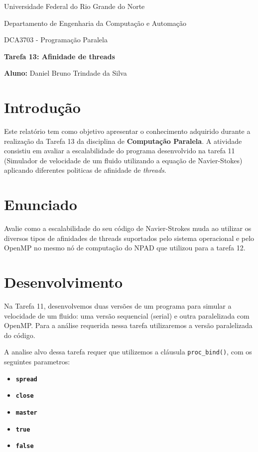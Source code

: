 \documentclass[a4paper, 12pt]{article}
\begin{document}
	\begin{center}
		Universidade Federal do Rio Grande do Norte
		
		Departamento de Engenharia da Computação e Automação  
		
		DCA3703 - Programação Paralela  
		
		\textbf{Tarefa 13: Afinidade de threads}  
		
		\textbf{Aluno:} Daniel Bruno Trindade da Silva  
	\end{center}  
	
	\section{Introdução}  
	\hspace{.62cm}Este relatório tem como objetivo apresentar o conhecimento adquirido durante a realização da Tarefa 13 da disciplina de \textbf{Computação Paralela}. A atividade consistiu em avaliar a escalabilidade do programa desenvolvido na tarefa 11 (Simulador de velocidade de um fluido utilizando a equação de Navier-Stokes) aplicando diferentes politicas de afinidade de \textit{threads}.
	
	\section{Enunciado}    
	\hspace{.62cm} Avalie como a escalabilidade do seu código de Navier-Strokes muda ao utilizar os diversos tipos de afinidades de threads suportados pelo sistema operacional e pelo OpenMP no mesmo nó de computação do NPAD que utilizou para a tarefa 12.
	
	\section{Desenvolvimento}
	\hspace{.62cm}Na Tarefa 11, desenvolvemos duas versões de um programa para simular a velocidade de um fluido: uma versão sequencial (serial) e outra paralelizada com OpenMP. Para a análise requerida nessa tarefa utilizaremos a versão paralelizada do código.
	
	A analise alvo dessa tarefa requer que utilizemos a cláusula \texttt{proc\_bind()}, com os seguintes parametros:
	
	\begin{itemize}
		\item \textbf{\texttt{spread}}
		\item \textbf{\texttt{close}}
		\item \textbf{\texttt{master}}
		\item \textbf{\texttt{true}}
		\item \textbf{\texttt{false}}
	\end{itemize}  
	
	 
\end{document}
